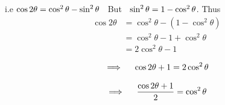 \documentclass[11pt,a4paper]{article}
\begin{document}
i.e $\cos 2\theta = \cos^2\theta - \sin^2\theta\hspace{0.2cm}$ But $\hspace{0.2cm}\sin^2\theta = 1 - \cos^2\theta$. Thus
\begin{align*}
\cos 2\theta & = \cos^2\theta - ( 1 - \cos^2\theta)\\
& = \cos^2\theta - 1 + \cos^2\theta\\
& = 2\cos^2\theta - 1
\end{align*} 

$$\implies \hspace{0.4cm} \cos 2\theta + 1 = 2\cos^2\theta$$

$$\implies \hspace{0.4cm} \dfrac{\cos 2\theta + 1}{2} = \cos^2\theta$$\\\\
\end{document}
